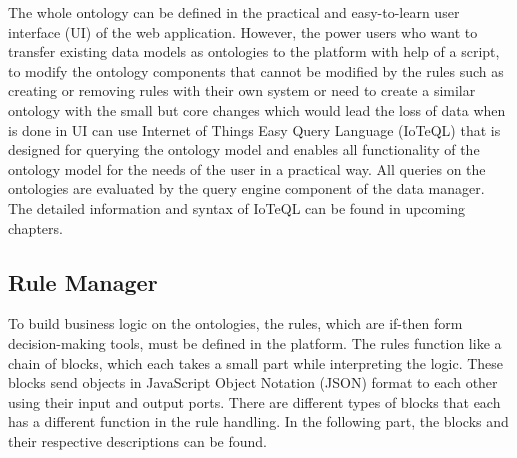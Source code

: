 The whole ontology can be defined in the practical and easy-to-learn user interface (UI) of the web application. However, the power users who want to transfer existing data models as ontologies to the platform with help of a script, to modify the ontology components that cannot be modified by the rules such as creating or removing rules with their own system or need to create a similar ontology with the small but core changes which would lead the loss of data when is done in UI can use Internet of Things Easy Query Language (IoTeQL) that is designed for querying the ontology model and enables all functionality of the ontology model for the needs of the user in a practical way. All queries on the ontologies are evaluated by the query engine component of the data manager. The detailed information and syntax of IoTeQL can be found in upcoming chapters. %


\subsection{Rule Manager}
\label{ss:rule_manager}

To build business logic on the ontologies, the rules, which are if-then form decision-making tools, must be defined in the platform. The rules function like a chain of blocks, which each takes a small part while interpreting the logic. These blocks send objects in JavaScript Object Notation (JSON) format to each other using their input and output ports. There are different types of blocks that each has a different function in the rule handling. In the following part, the blocks and their respective descriptions can be found.

